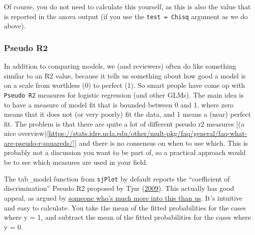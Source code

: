 \documentclass[
]{article}
\newenvironment{Shaded}{\begin{snugshade}}{\end{snugshade}}
\newcommand{\CommentTok}[1]{\textcolor[rgb]{0.56,0.35,0.01}{\textit{#1}}}
\newcommand{\DecValTok}[1]{\textcolor[rgb]{0.00,0.00,0.81}{#1}}
\newcommand{\KeywordTok}[1]{\textcolor[rgb]{0.13,0.29,0.53}{\textbf{#1}}}
\newcommand{\NormalTok}[1]{#1}
\newcommand{\OperatorTok}[1]{\textcolor[rgb]{0.81,0.36,0.00}{\textbf{#1}}}
\newcommand{\StringTok}[1]{\textcolor[rgb]{0.31,0.60,0.02}{#1}}
\begin{document}
Of course, you do not need to calculate this yourself, as this is also
the value that is reported in the anova output (if you use the
\texttt{test\ =\ \textquotesingle{}Chisq\textquotesingle{}} argument as
we do above).

\hypertarget{pseudo-r2}{%
\subsubsection{Pseudo R2}\label{pseudo-r2}}

In addition to comparing models, we (and reviewers) often do like
something similar to an R2 value, because it tells us something about
how good a model is on a scale from worthless (0) to perfect (1). So
smart people have come op with \texttt{Pseudo\ R2} measures for logistic
regression (and other GLMs). The main idea is to have a measure of model
fit that is bounded between 0 and 1, where zero means that it does not
(or very poorly) fit the data, and 1 means a (near) perfect fit. The
problem is that there are quite a lot of different pseudo r2 measures
{[}(a nice
overview){[}\url{https://stats.idre.ucla.edu/other/mult-pkg/faq/general/faq-what-are-pseudo-r-squareds/}{]}{]}
and there is no consensus on when to use which. This is probably not a
discussion you want to be part of, so a practical approach would be to
see which measures are used in your field.

The tab\_model function from \texttt{sjPlot} by default reports the
``coefficient of discrimination'' Pseudo R2 proposed by Tjur
(\href{https://www.tandfonline.com/doi/abs/10.1198/tast.2009.08210}{2009}).
This actually has good appeal, as argued by
\href{https://statisticalhorizons.com/r2logistic}{someone who's much
more into this than us}. It's intuitive and easy to calculate. You take
the mean of the fitted probabilities for the cases where y = 1, and
subtract the mean of the fitted probabilities for the cases where y = 0.

\begin{Shaded}
\end{Shaded}
\end{document}
